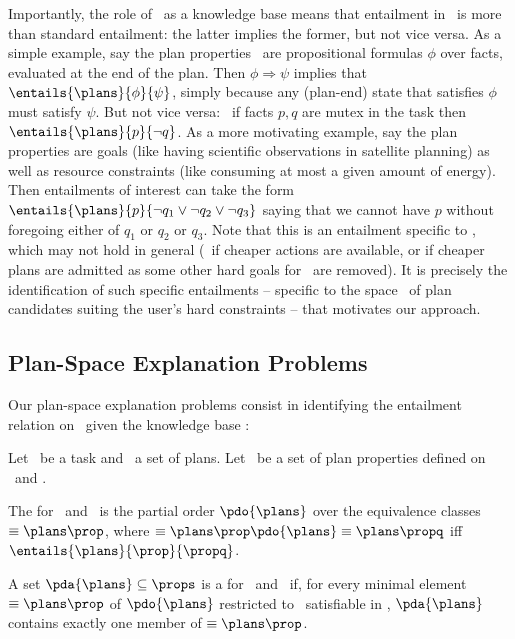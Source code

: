 Importantly, the role of \plans\ as a knowledge base means that
entailment in \plans\ is more than standard entailment: the latter
implies the former, but not vice versa. As a simple example, say the
plan properties \props\ are propositional formulas $\phi$ over facts,
evaluated at the end of the plan. Then $\phi \Rightarrow \psi$ implies
that $\entails{\plans}{\phi}{\psi}$, simply because any (plan-end)
state that satisfies $\phi$ must satisfy $\psi$. But not vice versa:
\eg\ if facts $p, q$ are mutex in the task then
$\entails{\plans}{p}{\neg q}$. As a more motivating example, say the
plan properties are goals (like having scientific observations in
satellite planning) as well as resource constraints (like consuming at
most a given amount of energy). Then entailments of interest can take
the form $\entails{\plans}{p}{\neg q_1 \vee \neg q_2 \vee \neg q_3}$
saying that we cannot have $p$ without foregoing either of $q_1$ or
$q_2$ or $q_3$. Note that this is an entailment specific to \plans,
which may not hold in general (\eg\ if cheaper actions are available,
or if cheaper plans are admitted as some other hard goals for
\plans\ are removed). It is precisely the identification of such
specific entailments -- specific to the space \plans\ of plan
candidates suiting the user's hard constraints -- that motivates our
approach.





\subsection{Plan-Space Explanation Problems}

Our plan-space explanation problems consist in identifying the
entailment relation on \props\ given the knowledge base \plans:

\begin{definition}
Let \task\ be a task and \plans\ a set of plans. Let \props\ be a set
of plan properties defined on \task\ and \plans.

The  for \plans\ and
\props\ is the partial order $\pdo{\plans}$ over the equivalence
classes $\equiv{\plans}{\prop}$, where $\equiv{\plans}{\prop}
\pdo{\plans} \equiv{\plans}{\propq}$ iff
$\entails{\plans}{\prop}{\propq}$.

A set $\pda{\plans} \subseteq \props$ is a  for \plans\ and \props\ if, for
every minimal element $\equiv{\plans}{\prop}$ of $\pdo{\plans}$
restricted to \prop\ satisfiable in \plans, $\pda{\plans}$ contains
exactly one member of $\equiv{\plans}{\prop}$.
\end{definition}

